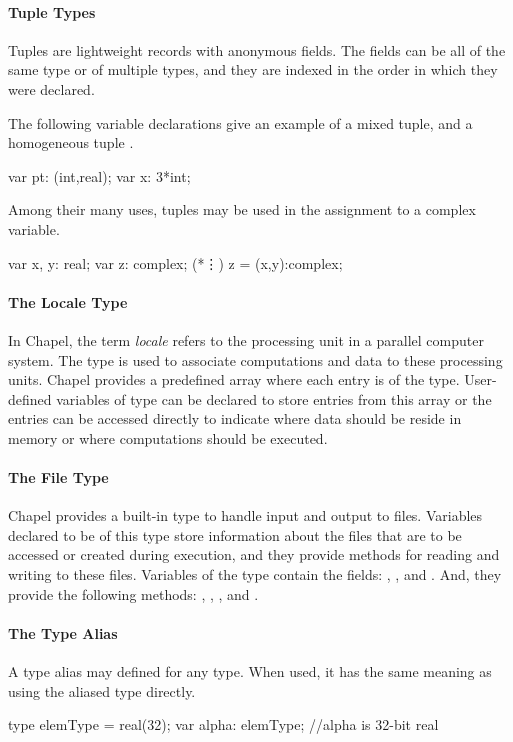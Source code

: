 \paragraph{Tuple Types}
Tuples are lightweight records with anonymous fields.
The fields can be all of the same type or of multiple types, and
they are indexed in the order in which they were declared.
\begin{example}
The following variable declarations give an example of a mixed tuple,
 and a homogeneous tuple .
\begin{chapel}
var pt: (int,real);
var x: 3*int;
\end{chapel}

Among their many uses, tuples may be used in the assignment to a
complex variable.
\begin{chapel}
var x, y: real;
var z: complex;
(*\vdots*)
z = (x,y):complex;
\end{chapel}
\end{example}

\paragraph{The Locale Type}
In Chapel, the term {\em locale} refers to the processing unit in a parallel
computer system.  The  type is used to associate 
computations and data to these processing units.  Chapel provides
a predefined array  where each entry is of the 
type.  User-defined variables of  type can be declared to store 
entries from this  array or the entries can be accessed 
directly to indicate where data should be reside in memory or where computations
should be executed.   

\paragraph{The File Type}
Chapel provides a built-in  type to handle input and
output to files.  Variables declared to be of this type store
information about the files that are to be accessed or created during
execution, and they provide methods for reading and writing to these
files.  Variables of the  type contain the
fields:  , , and .
And, they provide the following methods:
, , ,  and .

\paragraph{The Type Alias}
A type alias may defined for any type.  When used, it has the
same meaning as using the aliased type directly.
\begin{chapel}
type elemType = real(32);
var alpha: elemType; //alpha is 32-bit real
\end{chapel}

